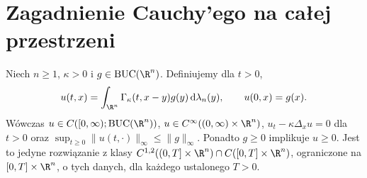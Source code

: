 \section{Zagadnienie Cauchy'ego na całej przestrzeni}
\label{sec:pde4-cauchy}

\begin{twierdzenie}
\label{thm:pde4-cauchy}
Niech $n\geq1$, $\kappa>0$ i $g\in\mathrm{BUC}(\R^n)$.
Definiujemy dla $t>0$,
\begin{equation}\label{eq:pde4-cauchy}
 u(t,x)=\int_{\R^n}\Gamma_\kappa(t,x-y)g(y)
 \,\mathrm d\lambda_n(y),\qquad u(0,x)=g(x).
\end{equation}
Wówczas $u\in C([0,\infty);\mathrm{BUC}(\R^n))$,
$u\in C^\infty((0,\infty)\times\R^n)$,
$u_t-\kappa\Delta_xu=0$ dla $t>0$ oraz
$\sup_{t\geq0}\|u(t,\cdot)\|_\infty\leq\|g\|_\infty$.
Ponadto $g\geq0$ implikuje $u\geq0$.
Jest to jedyne rozwiązanie z klasy
$C^{1,2}((0,T]\times\R^n)\cap C([0,T]\times\R^n)$,
ograniczone na $[0,T]\times\R^n$, o tych danych,
dla każdego ustalonego $T>0$.
\end{twierdzenie}

